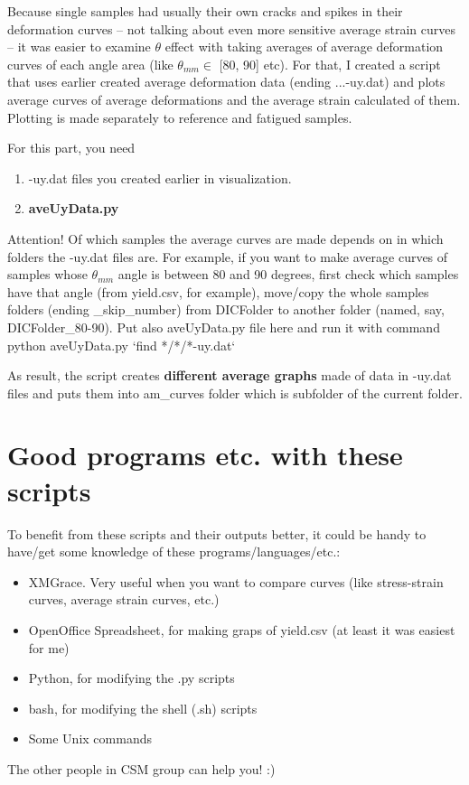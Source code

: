 \documentclass[a4paper]{article}
\begin{document}
Because single samples had usually their own cracks and spikes in their 
deformation curves -- not talking about even more sensitive average strain 
curves -- it was easier to examine $\theta$ effect with taking averages of 
average deformation curves of each angle area (like $\theta_{mm} \in$ 
[80\textdegree, 90\textdegree] etc). For that, I created a script that uses 
earlier created average deformation data (ending ...-uy.dat) and plots average 
curves of average deformations and the average strain calculated of them. 
Plotting is made separately to reference and fatigued samples.

For this part, you need

\begin{enumerate}
\item -uy.dat files you created earlier in visualization.
\item \textbf{aveUyData.py}
\end{enumerate}

Attention! Of which samples the average curves are made depends on in which 
folders the -uy.dat files are. For example, if you want to make average curves 
of samples whose $\theta_{mm}$ angle is between 80 and 90 degrees, first check 
which samples have that angle (from yield.csv, for example), move/copy the 
whole samples folders (ending \_skip\_number) from DICFolder to another folder 
(named, say, DICFolder\_80-90). Put also aveUyData.py file here and run it with 
command \textsf{python aveUyData.py `find */*/*-uy.dat`}

As result, the script creates \textbf{different average graphs} made of data 
in -uy.dat files and puts them into am\_curves folder which is subfolder of 
the current folder.

\section{Good programs etc. with these scripts}

To benefit from these scripts and their outputs better, it could be handy to 
have/get some knowledge of these programs/languages/etc.:

\begin{itemize}
\item XMGrace. Very useful when you want to compare curves (like stress-strain 
curves, average strain curves, etc.)
\item OpenOffice Spreadsheet, for making graps of yield.csv (at least it was 
easiest for me)
\item Python, for modifying the .py scripts
\item bash, for modifying the shell (.sh) scripts
\item Some Unix commands
\end{itemize}

The other people in CSM group can help you! :)
\end{document}
